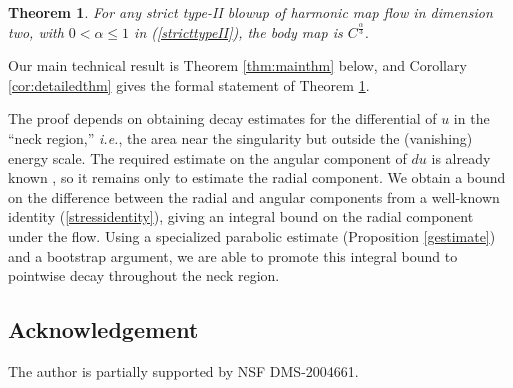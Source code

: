 \documentclass[12pt]{amsart}
\newtheorem{thm}{Theorem}[section]
\theoremstyle{others}
\numberwithin{equation}{section}
\begin{document}
\begin{thm}\label{thm:intro} For any strict type-II blowup of harmonic map flow in dimension two, with $0 < \alpha \leq 1$ in (\ref{stricttypeII}),
the body map is $C^{ \frac{\alpha}{3} }.$
\end{thm}


\noindent Our main technical result is Theorem \ref{thm:mainthm} below, %
and Corollary \ref{cor:detailedthm} gives the formal statement of Theorem \ref{thm:intro}. %


The proof %
depends on obtaining decay estimates for the differential of $u$ in the ``neck region,'' {\it i.e.}, the area near the singularity but outside the (vanishing) energy scale.
The required estimate on the angular component of $du$ is already known \cite[Lemma 5.4]{songwaldron}, %
so it remains only to estimate the radial component.
We obtain a bound on the difference between the radial and angular components from a well-known identity (\ref{stressidentity}), giving an integral bound on the radial component under the flow. %
Using a specialized parabolic estimate (Proposition \ref{gestimate}) and a bootstrap argument, we are able to promote this integral bound to pointwise decay throughout the neck region. %




\subsection*{Acknowledgement} The author is partially supported by NSF DMS-2004661.
\end{document}
